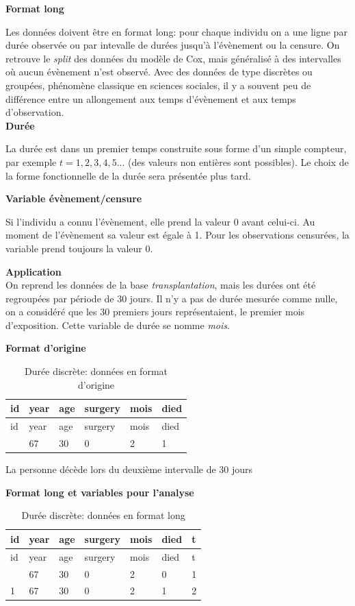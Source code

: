 \documentclass[
  12pt,
  letterpaper,
  DIV=11,
  numbers=noendperiod,
  onepage,
  openany]{scrreprt}
\begin{document}
\textbf{Format long}

Les données doivent être en format long: pour chaque individu on a une
ligne par durée observée ou par intevalle de durées jusqu'à l'évènement
ou la censure. On retrouve le \emph{split} des données du modèle de Cox,
mais généralisé à des intervalles où aucun évènement n'est observé. Avec
des données de type discrètes ou groupées, phénomène classique en
sciences sociales, il y a souvent peu de différence entre un allongement
aux temps d'évènement et aux temps d'observation.\\

\textbf{Durée}

La durée est dans un premier temps construite sous forme d'un simple
compteur, par exemple \(t=1,2,3,4,5...\) (des valeurs non entières sont
possibles). Le choix de la forme fonctionnelle de la durée sera
présentée plus tard.

\textbf{Variable évènement/censure}

Si l'individu a connu l'évènement, elle prend la valeur 0 avant
celui-ci. Au moment de l'évènement sa valeur est égale à 1. Pour les
observations censurées, la variable prend toujours la valeur 0.

\textbf{Application}\\
On reprend les données de la base \emph{transplantation}, mais les
durées ont été regroupées par période de 30 jours. Il n'y a pas de durée
mesurée comme nulle, on a considéré que les 30 premiers jours
représentaient, le premier mois d'exposition. Cette variable de durée se
nomme \emph{mois}.

\textbf{Format d'origine}

\begin{longtable}[]{@{}llllll@{}}
\caption{Durée discrète: données en format d'origine}\tabularnewline
\toprule\noalign{}
id & year & age & surgery & mois & died \\
\midrule\noalign{}
\endfirsthead
\toprule\noalign{}
id & year & age & surgery & mois & died \\
\midrule\noalign{}
\endhead
\bottomrule\noalign{}
\endlastfoot
1 & 67 & 30 & 0 & 2 & 1 \\
\end{longtable}

La personne décède lors du deuxième intervalle de 30 jours

\textbf{Format long et variables pour l'analyse}

\begin{longtable}[]{@{}lllllll@{}}
\caption{Durée discrète: données en format long}\tabularnewline
\toprule\noalign{}
id & year & age & surgery & mois & died & t \\
\midrule\noalign{}
\endfirsthead
\toprule\noalign{}
id & year & age & surgery & mois & died & t \\
\midrule\noalign{}
\endhead
\bottomrule\noalign{}
\endlastfoot
1 & 67 & 30 & 0 & 2 & 0 & 1 \\
1 & 67 & 30 & 0 & 2 & 1 & 2 \\
\end{longtable}
\end{document}
